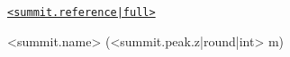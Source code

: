 \begin{minipage}{\textwidth}\centering
{\fontsize{25pt}{0pt}\selectfont \href{https://summits.sota.org.uk/summit/<summit.reference|full>}{\texttt{<summit.reference|full>}}\par}
{\fontsize{10pt}{0pt}\selectfont <summit.name> (<summit.peak.z|round|int> m)\par}
\end{minipage}
